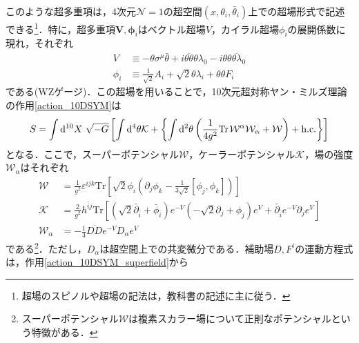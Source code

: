 \documentclass[a4paper,uplatex,dvipdfmx,10pt]{jsarticle}
\theoremstyle{definition}
\begin{document}
このような超多重項は，4次元$\mathcal{N}=1$の超空間$(x,\theta_{i},\bar{\theta}_{i})$上での超場形式で記述できる\footnote{
   超場のスピノルや超場の記法は，教科書\cite{Wess_SupersymmetrySupergravity_1992}の記述に主に従う．
}．特に，超多重項$\bm{V},\bm{\phi}_{i}$はベクトル超場$V$，カイラル超場$\phi_{i}$の展開係数に現れ，それぞれ
\begin{align}
   V
   &\equiv
   -
   \theta\sigma^{\mu}\bar{\theta}
   +
   i\overline{\theta\theta}\theta\lambda_{0}
   -
   i\theta\theta\overline{\theta\lambda}_{0}
   \nonumber
   \\
   \phi_{i}
   &\equiv
   \frac{1}{\sqrt{2}}A_{i}
   +
   \sqrt{2}\theta\lambda_{i}
   +
   \theta\theta F_{i}
   \nonumber
\end{align}
である(WZゲージ)．この超場を用いることで，10次元超対称ヤン・ミルズ理論の作用\eqref{action_10DSYM}は
\begin{equation}
   S
   =
   \int\dd^{10} X\ \sqrt{-G}
   \left[  
      \int\dd^4\theta
      \mathcal{K}
      +
      \left\{  
         \int\dd^2\theta
         \left(  
            \frac{1}{4g^2}\text{Tr\hspace*{1pt}}\mathcal{W^{\alpha}\mathcal{W}_{\alpha}}
            +
            \mathcal{W}
         \right)
         +
         \text{h.c.}
      \right\}
   \right]
   \label{action_10DSYM_superfield}
\end{equation}
となる\cite{Arkani-Hamed_HigherDimensional_2002}．ここで，スーパーポテンシャル$\mathcal{W}$，ケーラーポテンシャル$\mathcal{K}$，場の強度$\mathcal{W}_{\alpha}$はそれぞれ
\begin{align}
   \mathcal{W}
   &=
   \frac{1}{g^2}\varepsilon^{ijk}\text{Tr}
   \left[  
      \sqrt{2}\phi_{i}
      \left(  
         \partial_{j}\phi_{k}
         -
         \frac{1}{3\sqrt{2}}[\phi_{j},\phi_{k}]
      \right)
   \right]
   \nonumber
   \\
   \mathcal{K}
   &=
   \frac{2}{g^2}h^{\bar{i}j}
   \text{Tr}
   \left[  
      (\sqrt{2}\bar{\partial}_{\bar{i}}+\bar{\phi}_{\bar{i}})e^{-V}
      (-\sqrt{2}\partial_{j}+\phi_{j})e^{V}
      +
      \bar{\partial}_{\bar{i}}e^{-V}\partial_{j}e^{V}
   \right]
   \nonumber
   \\
   \mathcal{W}_{\alpha}
   &=
   -
   \frac{1}{4}\overline{DD}e^{-V}D_{\alpha}e^{V}
   \nonumber
\end{align}
である\footnote{
   スーパーポテンシャル$\mathcal{W}$は複素スカラー場について正則なポテンシャルという特徴がある．
}．ただし，$D_{\alpha}$は超空間上での共変微分である．補助場$D,F^{i}$の運動方程式は，作用\eqref{action_10DSYM_superfield}から
\end{document}
